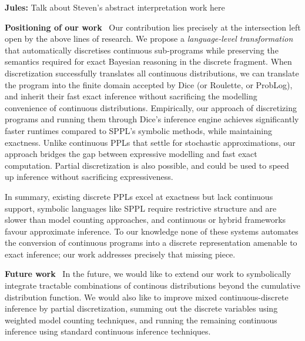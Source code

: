 \documentclass[acmsmall,screen,dvipsnames,x11names,nonacm,anonymous,review]{acmart}
\renewcommand{\paragraph}[1]{\vspace{1em}\noindent\textbf{#1}\ }
\newcommand{\jules}[1]{{\color{blue}\textbf{Jules:} #1}}
\begin{document}
\jules{Talk about Steven's abstract interpretation work here}

\paragraph{Positioning of our work}  
Our contribution lies precisely at the intersection left open by the above lines of research. We propose a \emph{language-level transformation} that automatically discretises continuous sub-programs while preserving the semantics required for exact Bayesian reasoning in the discrete fragment. When discretization successfully translates all continuous distributions, we can translate the program into the finite domain accepted by Dice (or Roulette, or ProbLog), and inherit their fast exact inference without sacrificing the modelling convenience of continuous distributions. 
Empirically, our approach of discretizing programs and running them through Dice's inference engine achieves significantly faster runtimes compared to SPPL's symbolic methods, while maintaining exactness. Unlike continuous PPLs that settle for stochastic approximations, our approach bridges the gap between expressive modelling and fast exact computation. Partial discretization is also possible, and could be used to speed up inference without sacrificing expressiveness.

\medskip  
In summary, existing discrete PPLs excel at exactness but lack continuous support, symbolic languages like SPPL require restrictive structure and are slower than model counting approaches, and continuous or hybrid frameworks favour approximate inference. To our knowledge none of these systems automates the conversion of continuous programs into a discrete representation amenable to exact inference; our work addresses precisely that missing piece.

\paragraph{Future work}
In the future, we would like to extend our work to symbolically integrate tractable combinations of continous distributions beyond the cumulative distribution function.
We would also like to improve mixed continuous-discrete inference by partial discretization, summing out the discrete variables using weighted model counting techniques, and running the remaining continuous inference using standard continuous inference techniques.



\end{document}
